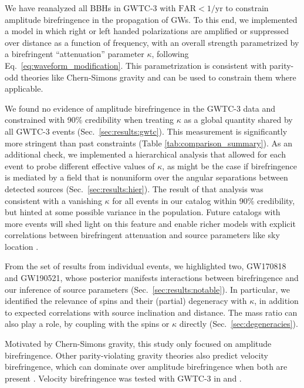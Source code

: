 \documentclass[aps,prd,twocolumn,superscriptaddress,preprintnumbers,nofootinbib]{revtex4-2}
\begin{document}
We have reanalyzed all \acp{BBH} in GWTC-3 with $\mathrm{FAR} < 1/\mathrm{yr}$ to constrain amplitude birefringence in the propagation of \acp{GW}.
To this end, we implemented a model in which right or left handed polarizations are amplified or suppressed over distance as a function of frequency, with an overall strength parametrized by a birefringent ``attenuation'' parameter $\kappa$, following Eq.~\eqref{eq:waveform_modification}.
This parametrization is consistent with parity-odd theories like Chern-Simons gravity and can be used to constrain them where applicable.

We found no evidence of amplitude birefringence in the GWTC-3 data and constrained with 90\% credibility when treating $\kappa$ as a global quantity shared by all GWTC-3 events (Sec.~\ref{sec:results:gwtc}).
This measurement is significantly more stringent than past constraints (Table \ref{tab:comparison_summary}).
As an additional check, we implemented a hierarchical analysis that allowed for each event to probe different effective values of $\kappa$, as might be the case if birefringence is mediated by a field that is nonuniform over the angular separations between detected sources (Sec.~\ref{sec:results:hier}).
The result of that analysis was consistent with a vanishing $\kappa$ for all events in our catalog within 90\% credibility, but hinted at some possible variance in the population.
Future catalogs with more events will shed light on this feature and enable richer models with explicit correlations between birefringent attenuation and source parameters like sky location \citep{Goyal:2023uvm,Ezquiaga:2021ler}.

From the set of results from individual events, we highlighted two, GW170818 and GW190521, whose posterior manifests interactions between birefringence and our inference of source parameters (Sec.~\ref{sec:results:notable}).
In particular, we identified the relevance of spins and their (partial) degeneracy with $\kappa$, in addition to expected correlations with source inclination and distance.
The mass ratio can also play a role, by coupling with the spins or $\kappa$ directly (Sec.~\ref{sec:degeneracies}).

Motivated by Chern-Simons gravity, this study only focused on amplitude birefringence.
Other parity-violating gravity theories also predict velocity birefringence, which can dominate over amplitude birefringence when both are present \cite{Zhao:2019xmm}.
Velocity birefringence was tested with GWTC-3 in \citet{Wang:2021gqm} and \citet{Haegel:2022ymk}.
\end{document}
